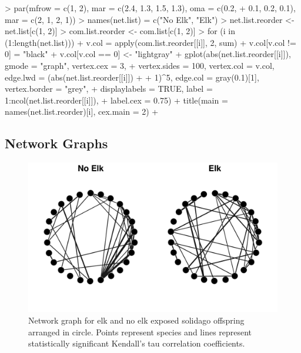 \documentclass[11pt]{amsart}
\begin{document}
\begin{Schunk}
\begin{Sinput}
> par(mfrow = c(1, 2), mar = c(2.4, 1.3, 1.5, 1.3), oma = c(0.2, 
+     0.1, 0.2, 0.1), mar = c(2, 1, 2, 1))
> names(net.list) = c("No Elk", "Elk")
> net.list.reorder <- net.list[c(1, 2)]
> com.list.reorder <- com.list[c(1, 2)]
> for (i in (1:length(net.list))) {
+     v.col = apply(com.list.reorder[[i]], 2, sum)
+     v.col[v.col != 0] = "black"
+     v.col[v.col == 0] <- "lightgray"
+     gplot(abs(net.list.reorder[[i]]), gmode = "graph", vertex.cex = 3, 
+         vertex.sides = 100, vertex.col = v.col, edge.lwd = (abs(net.list.reorder[[i]]) + 
+             1)^5, edge.col = gray(0.1)[1], vertex.border = "grey", 
+         displaylabels = TRUE, label = 1:ncol(net.list.reorder[[i]]), 
+         label.cex = 0.75)
+     title(main = names(net.list.reorder)[i], cex.main = 2)
+ }
\end{Sinput}
\end{Schunk}



\subsection*{Network Graphs}

\begin{figure} 
\begin{center} 
\includegraphics{SPN_figures-net1}
\end{center} 
\caption{Network graph for elk and no elk exposed solidago offspring
  arranged in circle. Points represent species and lines represent
  statistically significant Kendall's tau correlation
  coefficients.} 
\label{fig:one}
\end{figure}
\end{document}
